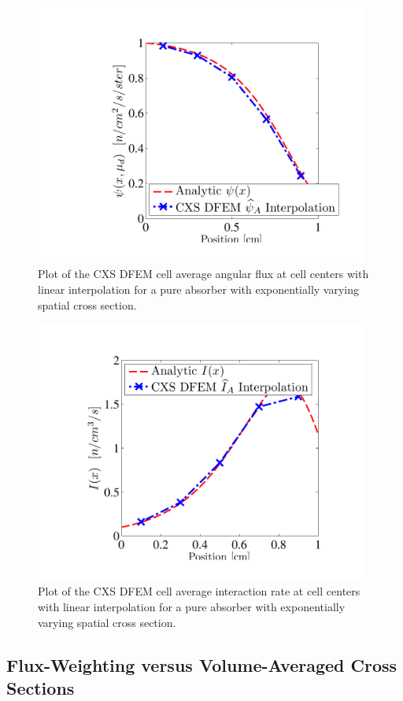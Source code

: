 \begin{figure}[!htp]
\centering
\includegraphics[width=11cm]{chapter3_variable_xs/CXS_Psi_A_Profile.pdf}
\caption{Plot of the CXS DFEM cell average angular flux at cell centers with linear interpolation for a pure absorber with exponentially varying spatial cross section.}
\label{fig:cxs_avg_psi}
\end{figure}
%
\begin{figure}[!hbp]
\centering
\includegraphics[width=11cm]{chapter3_variable_xs/CXS_I_A_Profile.pdf}
\caption{Plot of the CXS DFEM cell average interaction rate at cell centers with linear interpolation for a pure absorber with exponentially varying spatial cross section.}
\label{fig:cxs_avg_ir}
\end{figure}


%
\subsection{Flux-Weighting versus Volume-Averaged Cross Sections}

